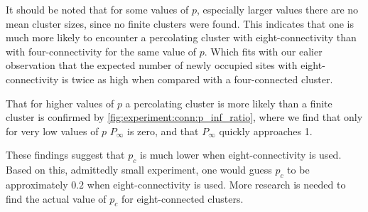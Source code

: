 
It should be noted that for some values of $p$, especially larger values there are no mean cluster sizes, since no finite clusters were found. This indicates that one is much more likely to encounter a percolating cluster with eight-connectivity than with four-connectivity for the same value of $p$. Which fits with our ealier observation that the expected number of newly occupied sites with eight-connectivity is twice as high when compared with a four-connected cluster.

That for higher values of $p$ a percolating cluster is more likely than a finite cluster is confirmed by \cref{fig:experiment:conn:p_inf_ratio}, where we find that only for very low values of $p$ $P_\infty$ is zero, and that $P_\infty$ quickly approaches 1. 

These findings suggest that $p_c$ is much lower when eight-connectivity is used. Based on this, admittedly small experiment, one would guess $p_c$ to be approximately $0.2$ when eight-connectivity is used. More research is needed to find the actual value of $p_c$ for eight-connected clusters.\\




